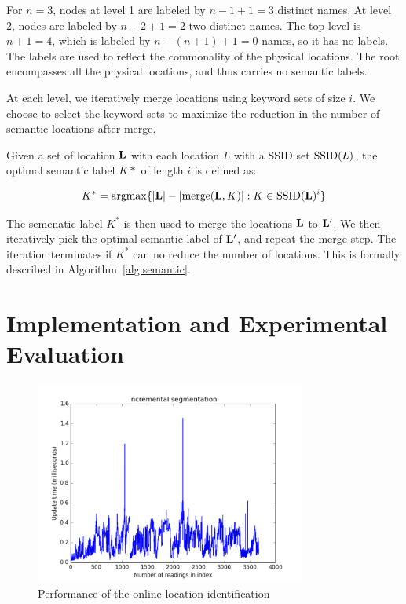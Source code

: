 For $n=3$, nodes at level 1 are labeled by $n-1+1=3$ distinct names.  At level
2, nodes are labeled by $n-2+1=2$ two distinct names.  The top-level is $n+1=4$,
which is labeled by $n-(n+1)+1 = 0$ names, so it has no labels.
The labels are used to reflect the commonality of the physical locations.
The root encompasses all the physical locations, and thus carries no semantic
labels.

At each level,  we iteratively merge locations using keyword sets of size
$i$.  We choose to select the keyword sets 
to maximize the reduction in the number of semantic locations after
merge.

Given a set of location $\mathbf{L}$ with each location $L$ with a SSID set $\mathrm{SSID}(L)$,
the optimal semantic label $K*$ of length $i$ is defined as:

$$ K^* = \mathrm{argmax} \{|\mathbf{L}| - |\mathrm{merge}(\mathbf{L}, K)| : K\in\mathrm{SSID}(\mathbf{L})^i\}$$

The semenatic label $K^*$ is then used to merge the locations $\mathbf{L}$ to $\mathbf{L}'$.  We then
iteratively pick the optimal semantic label of $\mathbf{L}'$, and repeat the merge
step.  The iteration terminates if $K^*$ can no reduce the number of locations.
This is formally described in Algorithm~\ref{alg:semantic}.

\section{Implementation and Experimental Evaluation}

\begin{figure}[t]
    \centering
    \includegraphics[width=3.5in]{../plots/incremental.pdf}
    \caption{Performance of the online location identification}
    \label{fig:incremental}
\end{figure}
